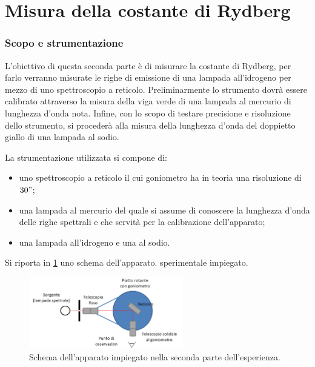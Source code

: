 \part{Misura della costante di Rydberg}
\section{Scopo e strumentazione}
	L'obiettivo di questa seconda parte è di misurare la costante di Rydberg, per farlo verranno misurate le righe di emissione di una lampada all'idrogeno per mezzo di uno spettroscopio a reticolo. Preliminarmente lo strumento dovrà essere calibrato attraverso la misura della viga verde di una lampada al mercurio di lunghezza d'onda nota.
	Infine, con lo scopo di testare precisione e risoluzione dello strumento, si procederà alla misura della lunghezza d'onda del doppietto giallo di una lampada al sodio.

La strumentazione utilizzata si compone di:
\begin{itemize}
	\item uno spettroscopio a reticolo il cui goniometro ha in teoria una risoluzione di $30"$;
	\item una lampada al mercurio del quale si assume di conoscere la lunghezza d'onda delle righe spettrali e che servità per la calibrazione dell'apparato;
	\item una lampada all'idrogeno e una al sodio.
\end{itemize}

Si riporta in \figurename{ \ref{fig:reticolo}} uno schema dell'apparato.
sperimentale impiegato. 
\begin{figure} [H]
	\centering
	\includegraphics[width=0.6\textwidth]{../Figs-tabs/reticolo.png}
	\caption{Schema dell'apparato impiegato nella seconda parte dell'esperienza.}
	\label{fig:reticolo}
\end{figure}
